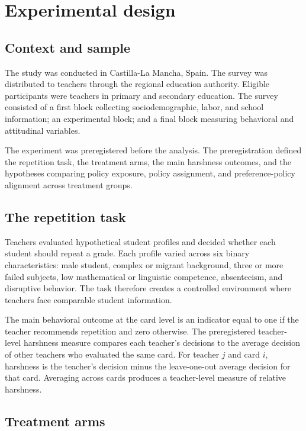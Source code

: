 \documentclass[12pt,a4paper]{article}
\begin{document}
\section{Experimental design}

\subsection{Context and sample}

The study was conducted in Castilla-La Mancha, Spain. The survey was distributed to teachers through the regional education authority. Eligible participants were teachers in primary and secondary education. The survey consisted of a first block collecting sociodemographic, labor, and school information; an experimental block; and a final block measuring behavioral and attitudinal variables.

The experiment was preregistered before the analysis. The preregistration defined the repetition task, the treatment arms, the main harshness outcomes, and the hypotheses comparing policy exposure, policy assignment, and preference-policy alignment across treatment groups.

\subsection{The repetition task}

Teachers evaluated hypothetical student profiles and decided whether each student should repeat a grade. Each profile varied across six binary characteristics: male student, complex or migrant background, three or more failed subjects, low mathematical or linguistic competence, absenteeism, and disruptive behavior. The task therefore creates a controlled environment where teachers face comparable student information.

The main behavioral outcome at the card level is an indicator equal to one if the teacher recommends repetition and zero otherwise. The preregistered teacher-level harshness measure compares each teacher's decisions to the average decision of other teachers who evaluated the same card. For teacher $j$ and card $i$, harshness is the teacher's decision minus the leave-one-out average decision for that card. Averaging across cards produces a teacher-level measure of relative harshness.

\subsection{Treatment arms}
\end{document}
